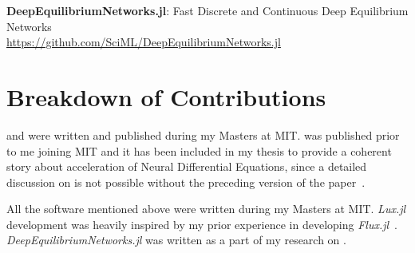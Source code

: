 \textbf{DeepEquilibriumNetworks.jl}: Fast Discrete and Continuous Deep Equilibrium Networks\\
{\small \url{https://github.com/SciML/DeepEquilibriumNetworks.jl}}

\section*{Breakdown of Contributions}

\citet{pal2022mixing} and \citet{pal2023locally} were written and published during my Masters at MIT. \citet{pal2021opening} was published prior to me joining MIT and it has been included in my thesis to provide a coherent story about acceleration of Neural Differential Equations, since a detailed discussion on \citet{pal2023locally} is not possible without the preceding version of the paper~\citep{pal2021opening}.

All the software mentioned above were written during my Masters at MIT. \textit{Lux.jl} development was heavily inspired by my prior experience in developing \textit{Flux.jl}~\citep{innes:2018, innes2018fashionable}. \textit{DeepEquilibriumNetworks.jl} was written as a part of my research on \citet{pal2022mixing}. 
